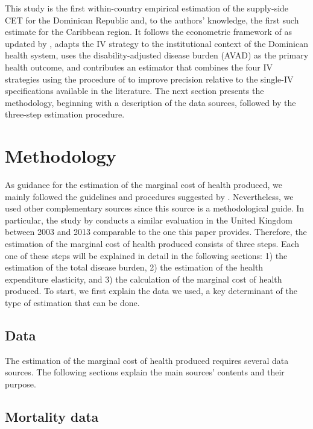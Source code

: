 \documentclass[11pt]{article}
\numberwithin{equation}{section}
\theoremstyle{remark}
\begin{document}
This study is the first within-country empirical estimation of the supply-side CET for the Dominican Republic and, to the authors' knowledge, the first such estimate for the Caribbean region. It follows the econometric framework of \citet{Claxton2015} as updated by \citet{Martin2021}, adapts the IV strategy to the institutional context of the Dominican health system, uses the disability-adjusted disease burden (AVAD) as the primary health outcome, and contributes an estimator that combines the four IV strategies using the procedure of \citet{Lavancier2016} to improve precision relative to the single-IV specifications available in the literature. The next section presents the methodology, beginning with a description of the data sources, followed by the three-step estimation procedure.

\section{Methodology}

As guidance for the estimation of the marginal cost of health produced, we mainly followed the guidelines and procedures suggested by \citet{Claxton2015}. Nevertheless, we used other complementary sources since this source is a methodological guide. In particular, the study by \citet{Martin2021} conducts a similar evaluation in the United Kingdom between 2003 and 2013 comparable to the one this paper provides. Therefore, the estimation of the marginal cost of health produced consists of three steps. Each one of these steps will be explained in detail in the following sections: 1) the estimation of the total disease burden, 2) the estimation of the health expenditure elasticity, and 3) the calculation of the marginal cost of health produced. To start, we first explain the data we used, a key determinant of the type of estimation that can be done. 


\subsection{Data}

The estimation of the marginal cost of health produced requires several data sources. The following sections explain the main sources' contents and their purpose.


\subsection{Mortality data}
\end{document}
